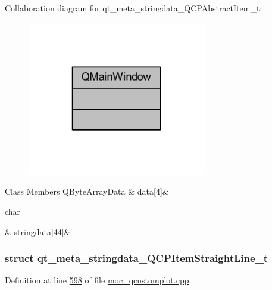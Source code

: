 Collaboration diagram for qt\+\_\+meta\+\_\+stringdata\+\_\+\+Q\+C\+P\+Abstract\+Item\+\_\+t\+:
\nopagebreak
\begin{figure}[H]
\begin{center}
\leavevmode
\includegraphics[width=222pt]{d9/d5e/a00295}
\end{center}
\end{figure}
\begin{DoxyFields}{Class Members}
\hypertarget{a00067_ab4317fd8db7c91bab9009e558b7cb145}{Q\+Byte\+Array\+Data}\label{a00067_ab4317fd8db7c91bab9009e558b7cb145}
&
data\mbox{[}4\mbox{]}&
\\
\hline

\hypertarget{a00067_ade6e562aa7d6defc621f68d53679440b}{char}\label{a00067_ade6e562aa7d6defc621f68d53679440b}
&
stringdata\mbox{[}44\mbox{]}&
\\
\hline

\end{DoxyFields}
\label{d1/d72/a00204}
\hypertarget{a00067_d1/d72/a00204}{}
\subsubsection{struct qt\+\_\+meta\+\_\+stringdata\+\_\+\+Q\+C\+P\+Item\+Straight\+Line\+\_\+t}


Definition at line \hyperlink{a00067_source_l00598}{598} of file \hyperlink{a00067_source}{moc\+\_\+qcustomplot.\+cpp}.



